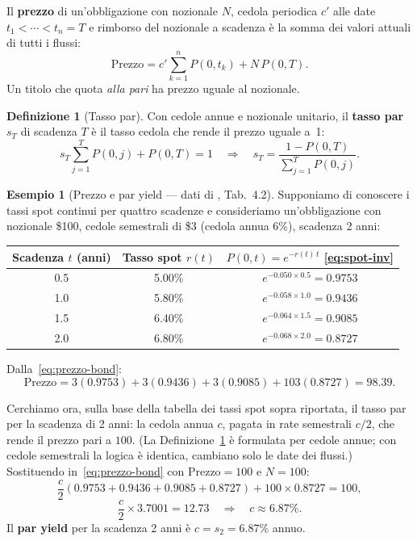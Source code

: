 \documentclass[11pt,a4paper]{article}
\theoremstyle{plain}
\theoremstyle{definition}
\newtheorem{definizione}[teorema]{Definizione}
\newtheorem{esempio}[teorema]{Esempio}
\theoremstyle{remark}
\begin{document}
Il \textbf{prezzo} di un'obbligazione con nozionale $N$, cedola periodica $c'$ alle
date $t_1 < \cdots < t_n = T$ e rimborso del nozionale a scadenza \`e la somma dei valori
attuali di tutti i flussi:
\begin{equation}
  \text{Prezzo} = c' \sum_{k=1}^{n} P(0,t_k) + N\,P(0,T).
  \label{eq:prezzo-bond}
\end{equation}
Un titolo che quota \emph{alla pari} ha prezzo uguale al nozionale.
\begin{definizione}[Tasso par]
\label{def:par}
Con cedole annue e nozionale unitario, il \textbf{tasso par} $s_T$ di scadenza $T$ \`e
il tasso cedola che rende il prezzo uguale a~1:
\[
  s_T \sum_{j=1}^{T} P(0,j) + P(0,T) = 1
  \quad\Longrightarrow\quad
  s_T = \frac{1 - P(0,T)}{\displaystyle\sum_{j=1}^{T} P(0,j)}.
\]
\end{definizione}
\begin{esempio}[Prezzo e par yield --- dati di \cite{hull2018}, Tab.~4.2]
\label{ex:hull42}
Supponiamo di conoscere i tassi spot continui per quattro scadenze e consideriamo un'obbligazione con nozionale \$100, cedole semestrali di \$3 (cedola
annua 6\%), scadenza 2 anni:
\begin{center}\small
\renewcommand{\arraystretch}{1.2}
\begin{tabular}{ccc}
\toprule
Scadenza $t$ (anni) & Tasso spot $r(t)$ & $P(0,t) = e^{-r(t)\,t}$ \eqref{eq:spot-inv} \\
\midrule
0.5 & 5.00\% & $e^{-0.050\times 0.5} = 0.9753$ \\
1.0 & 5.80\% & $e^{-0.058\times 1.0} = 0.9436$ \\
1.5 & 6.40\% & $e^{-0.064\times 1.5} = 0.9085$ \\
2.0 & 6.80\% & $e^{-0.068\times 2.0} = 0.8727$ \\
\bottomrule
\end{tabular}
\end{center}

 Dalla~\eqref{eq:prezzo-bond}:
\[
  \text{Prezzo}
  = 3(0.9753) + 3(0.9436) + 3(0.9085) + 103(0.8727)
  = 98.39.
\]

Cerchiamo ora, sulla base della tabella dei tassi spot sopra riportata, il tasso par per la
scadenza di 2 anni: la cedola annua $c$, pagata in rate semestrali $c/2$, che rende il
prezzo pari a $100$. (La Definizione~\ref{def:par} \`e formulata per cedole annue; con
cedole semestrali la logica \`e identica, cambiano solo le date dei flussi.)
Sostituendo in~\eqref{eq:prezzo-bond} con $\text{Prezzo}=100$ e $N=100$:
\[
  \frac{c}{2}(0.9753 + 0.9436 + 0.9085 + 0.8727) + 100\times 0.8727 = 100,
\]
\[
  \frac{c}{2}\times 3.7001 = 12.73
  \quad\Longrightarrow\quad
  c \approx 6.87\%.
\]
Il \textbf{par yield} per la scadenza 2 anni \`e $c = s_2 = 6.87\%$ annuo.%
\end{esempio}
\end{document}
